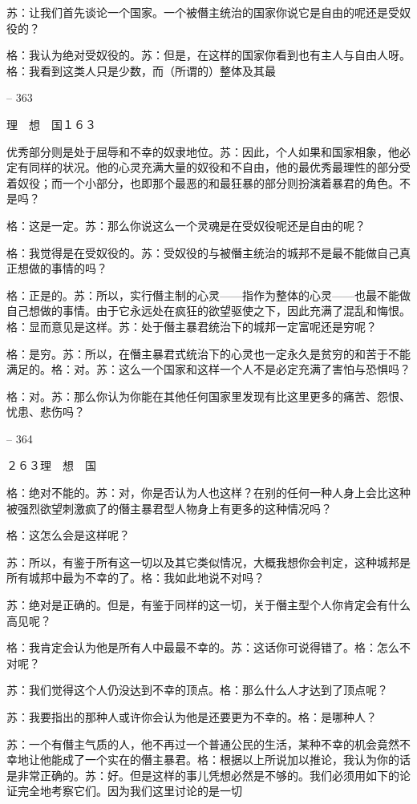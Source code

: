\documentclass[11pt,oneside]{book}
\begin{document}
\begin{common-format}
    苏：让我们首先谈论一个国家。一个被僭主统治的国家你说它是自由的呢还是受奴役的？

    格：我认为绝对受奴役的。苏：但是，在这样的国家你看到也有主人与自由人呀。格：我看到这类人只是少数，而（所谓的）整体及其最

    

-- 363

    理　想　国１６３

    优秀部分则是处于屈辱和不幸的奴隶地位。苏：因此，个人如果和国家相象，他必定有同样的状况。他的心灵充满大量的奴役和不自由，他的最优秀最理性的部分受着奴役；而一个小部分，也即那个最恶的和最狂暴的部分则扮演着暴君的角色。不是吗？

    格：这是一定。苏：那么你说这么一个灵魂是在受奴役呢还是自由的呢？

    格：我觉得是在受奴役的。苏：受奴役的与被僭主统治的城邦不是最不能做自己真正想做的事情的吗？

    格：正是的。苏：所以，实行僭主制的心灵——指作为整体的心灵——也最不能做自己想做的事情。由于它永远处在疯狂的欲望驱使之下，因此充满了混乱和悔恨。格：显而意见是这样。苏：处于僭主暴君统治下的城邦一定富呢还是穷呢？

    格：是穷。苏：所以，在僭主暴君式统治下的心灵也一定永久是贫穷的和苦于不能满足的。格：对。苏：这么一个国家和这样一个人不是必定充满了害怕与恐惧吗？

    格：对。苏：那么你认为你能在其他任何国家里发现有比这里更多的痛苦、怨恨、忧患、悲伤吗？

    

-- 364

    ２６３理　想　国

    格：绝对不能的。苏：对，你是否认为人也这样？在别的任何一种人身上会比这种被强烈欲望刺激疯了的僭主暴君型人物身上有更多的这种情况吗？

    格：这怎么会是这样呢？

    苏：所以，有鉴于所有这一切以及其它类似情况，大概我想你会判定，这种城邦是所有城邦中最为不幸的了。格：我如此地说不对吗？

    苏：绝对是正确的。但是，有鉴于同样的这一切，关于僭主型个人你肯定会有什么高见呢？

    格：我肯定会认为他是所有人中最最不幸的。苏：这话你可说得错了。格：怎么不对呢？

    苏：我们觉得这个人仍没达到不幸的顶点。格：那么什么人才达到了顶点呢？

    苏：我要指出的那种人或许你会认为他是还要更为不幸的。格：是哪种人？

    苏：一个有僭主气质的人，他不再过一个普通公民的生活，某种不幸的机会竟然不幸地让他能成了一个实在的僭主暴君。格：根据以上所说加以推论，我认为你的话是非常正确的。苏：好。但是这样的事儿凭想必然是不够的。我们必须用如下的论证完全地考察它们。因为我们这里讨论的是一切


\end{common-format}
\end{document}
